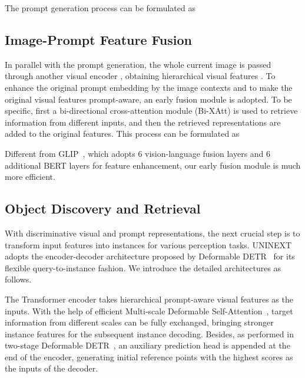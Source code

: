\documentclass[10pt,twocolumn,letterpaper]{article}
\begin{document}
The prompt generation process can be formulated as 



\subsection{Image-Prompt Feature Fusion}
In parallel with the prompt generation, the whole current image is passed through another visual encoder , obtaining hierarchical visual features . To enhance the original prompt embedding by the image contexts and to make the original visual features prompt-aware, an early fusion module is adopted. To be specific, first a bi-directional cross-attention module (Bi-XAtt) is used to retrieve information from different inputs, and then the retrieved representations are added to the original features. This process can be formulated as  

Different from GLIP~\cite{GLIP}, which adopts 6 vision-language fusion layers and 6 additional BERT layers for feature enhancement, our early fusion module is much more efficient.

\subsection{Object Discovery and Retrieval}

With discriminative visual and prompt representations, the next crucial step is to transform input features into instances for various perception tasks. UNINEXT adopts the encoder-decoder architecture proposed by Deformable DETR~\cite{DeformableDETR} for its flexible query-to-instance fashion. We introduce the detailed architectures as follows.

The Transformer encoder takes hierarchical prompt-aware visual features as the inputs. With the help of efficient Multi-scale Deformable Self-Attention~\cite{DeformableDETR}, target information from different scales can be fully exchanged, bringing stronger instance features for the subsequent instance decoding. Besides, as performed in two-stage Deformable DETR~\cite{DeformableDETR}, an auxiliary prediction head is appended at the end of the encoder, generating  initial reference points with the highest scores as the inputs of the decoder.
\end{document}
